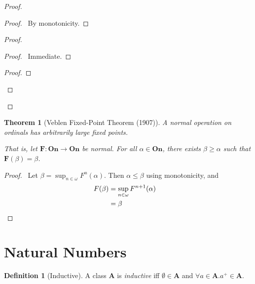 \documentclass{article}
\let\qed\relax
\newtheorem{theorem}[axiom]{Theorem}
\theoremstyle{definition}
\newtheorem{definition}[axiom]{Definition}
\begin{document}
    \begin{proof}
        \pf
        \begin{proof}
            \pf\ By monotonicity.
        \end{proof}
        \begin{proof}
            \begin{proof}
                \pf\ Immediate.
            \end{proof}
            \begin{proof}
            \end{proof}
        \end{proof}
        \qed
    \end{proof}

    \begin{theorem}[Veblen Fixed-Point Theorem (1907)]
        A normal operation on ordinals has arbitrarily large fixed points.

        That is, let $\mathbf{F} : \mathbf{On} \rightarrow \mathbf{On}$ be normal. For all $\alpha \in
        \mathbf{On}$, there exists $\beta \geq \alpha$ such that $\mathbf{F}(\beta) = \beta$.
    \end{theorem}

    \begin{proof}
        \pf\ Let $\beta = \sup_{n \in \omega} F^n(\alpha)$. Then $\alpha \leq \beta$ using monotonicity,
        and
        \begin{align*}
            F(\beta) & = \sup_{n \in \omega} F^{n+1}(\alpha) \\
            & = \beta & \qed
        \end{align*}
    \end{proof}
    
    \section{Natural Numbers}

    \begin{definition}[Inductive]
        A class $\mathbf{A}$ is \emph{inductive} iff $\emptyset \in \mathbf{A}$ and
        $\forall a \in \mathbf{A}. a^+ \in \mathbf{A}$.
    \end{definition}
\end{document}

